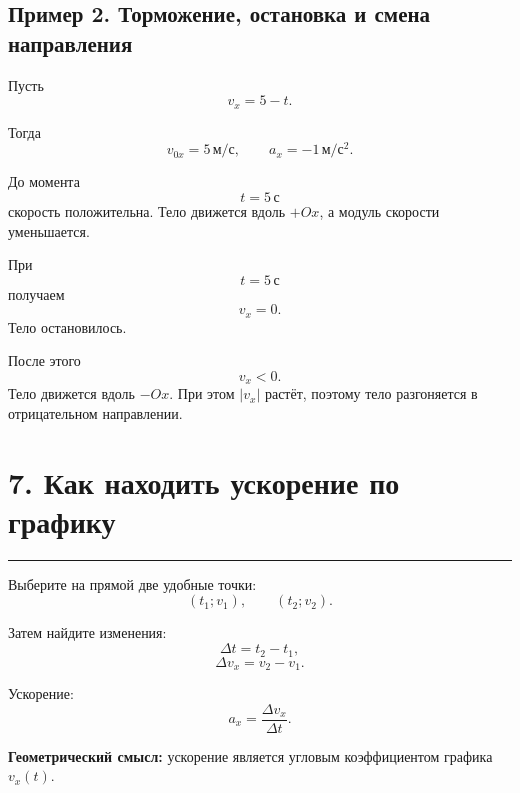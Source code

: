 \documentclass[a4paper,12pt]{article}
\newcommand{\sectionline}{%
  \par\vspace{-0.5em}%
  \noindent\textcolor{accent}{\rule{\linewidth}{0.7pt}}%
  \par\vspace{0.5em}%
}
\newcommand{\key}[1]{\textcolor{darkaccent}{\textbf{#1}}}
\begin{document}
\subsection*{Пример 2. Торможение, остановка и смена направления}

Пусть
\[
  v_x=5-t.
\]

Тогда
\[
  v_{0x}=5\,\text{м}/\text{с},
  \qquad
  a_x=-1\,\text{м}/\text{с}^2.
\]

До момента
\[
  t=5\,\text{с}
\]
скорость положительна. Тело движется вдоль \(+Ox\), а модуль скорости уменьшается.

При
\[
  t=5\,\text{с}
\]
получаем
\[
  v_x=0.
\]
Тело остановилось.

После этого
\[
  v_x<0.
\]
Тело движется вдоль \(-Ox\). При этом \(|v_x|\) растёт, поэтому тело разгоняется в отрицательном направлении.

\begin{center}
\end{center}


\section*{7. Как находить ускорение по графику}
\sectionline

Выберите на прямой две удобные точки:
\[
  (t_1;v_1),
  \qquad
  (t_2;v_2).
\]

Затем найдите изменения:
\[
  \Delta t=t_2-t_1,
\]
\[
  \Delta v_x=v_2-v_1.
\]

Ускорение:
\[
  \boxed{
  a_x=
  \frac{\Delta v_x}{\Delta t}
  }.
\]

\key{Геометрический смысл:}
ускорение является угловым коэффициентом графика \(v_x(t)\).
\end{document}
